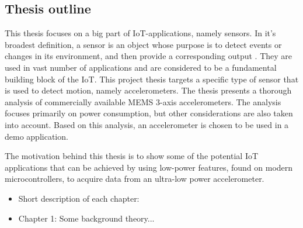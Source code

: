 \subsection{Thesis outline}

This thesis focuses on a big part of IoT-applications, namely sensors. In it's broadest definition, a sensor is an object whose purpose is to detect events or changes in its environment, and then provide a corresponding output \cite{wikipedia_sensors}. They are used in vast number of applications and are considered to be a fundamental building block of the IoT. This project thesis targets a specific type of sensor that is used to detect motion, namely accelerometers. The thesis presents a thorough analysis of commercially available MEMS 3-axis accelerometers. The analysis focuses primarily on power consumption, but other considerations are also taken into account. Based on this analysis, an accelerometer is chosen to be used in a demo application.

The motivation behind this thesis is to show some of the potential IoT applications that can be achieved by using low-power features, found on modern microcontrollers, to acquire data from an ultra-low power accelerometer.

\begin{itemize}
\item Short description of each chapter:
\item Chapter 1: Some background theory...
\end{itemize}

\newpage

